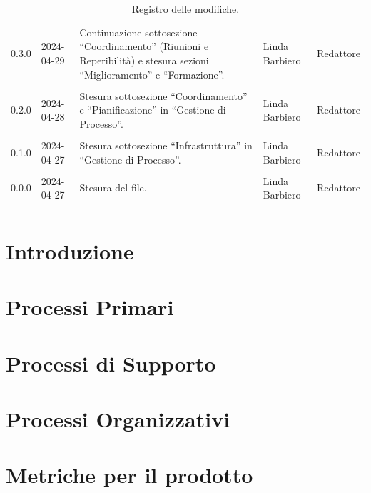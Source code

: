 \documentclass[8pt]{article}
\newcommand{\signatureline}[1]{%
	 \par\vspace{0.5cm}
	\noindent\makebox[\linewidth][r]{\rule{0.2\textwidth}{0.5pt}\hspace{3cm}\makebox[0pt][r]{\vspace{3pt}\footnotesize #1}}%
}
\begin{document}
\begin{table}[ht!]
\begin{tabular}{p{1.2cm} p{2cm} p{6cm} p{3cm} p{2cm}}
		0.3.0 & 2024-04-29 & Continuazione sottosezione ``Coordinamento'' (Riunioni e Reperibilità) e stesura sezioni ``Miglioramento'' e ``Formazione''. & Linda Barbiero & Redattore \\\\ %
		0.2.0 & 2024-04-28 & Stesura sottosezione ``Coordinamento'' e ``Pianificazione'' in ``Gestione di Processo''. & Linda Barbiero & Redattore \\\\ %
		0.1.0 & 2024-04-27 & Stesura sottosezione ``Infrastruttura'' in ``Gestione di Processo''. & Linda Barbiero & Redattore \\\\ %
		0.0.0 & 2024-04-27 & Stesura del file. & Linda Barbiero & Redattore \\\\ %
		\bottomrule
	\end{tabular}
	\caption{Registro delle modifiche.}
	\label{table:Registro delle modifiche}
\end{table}
\newpage
\tableofcontents
\clearpage
\newpage
\justifying
\justifying
\section{Introduzione} \label{sec:intro}

\section{Processi Primari} \label{sec:processi_primari}

\section{Processi di Supporto} \label{sec:processi_supporto}

\section{Processi Organizzativi} \label{sec:processi_organizzativi}

\section{Metriche per il prodotto} \label{sec:metriche_prodotto}

\newpage

\end{document}
